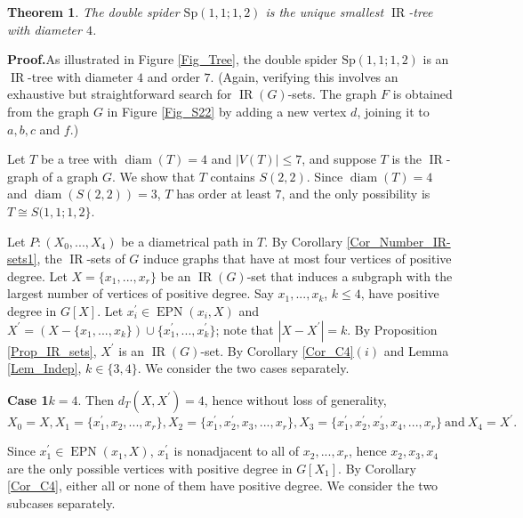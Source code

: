 \documentclass[12pt]{article}%
\newtheorem{theorem}{Theorem}[section]
\begin{document}
\begin{theorem}
\label{Thm_P5}The double spider $\mathrm{Sp}(1,1;1,2)$ is the unique smallest
$\operatorname{IR}$-tree with diameter $4$.
\end{theorem}

\noindent\textbf{Proof.\hspace{0.1in}}As illustrated in Figure \ref{Fig_Tree},
the double spider $\mathrm{Sp}(1,1;1,2)$ is an $\operatorname{IR}$-tree with
diameter $4$ and order $7$. (Again, verifying this involves an exhaustive but
straightforward search for $\operatorname{IR}(G)$-sets. The graph $F$ is
obtained from the graph $G$ in Figure \ref{Fig_S22} by adding a new vertex
$d$, joining it to $a,b,c$ and $f$.)

Let $T$ be a tree with $\operatorname{diam}(T)=4$ and $|V(T)|\leq7$, and
suppose $T$ is the $\operatorname{IR}$-graph of a graph $G$. We show that $T$
contains $S(2,2)$. Since $\operatorname{diam}(T)=4$ and $\operatorname{diam}%
(S(2,2))=3$, $T$ has order at least $7$, and the only possibility is $T\cong
S(1,1;1,2\}$.

Let $P:(X_{0},...,X_{4})$ be a diametrical path in $T$. By Corollary
\ref{Cor_Number_IR-sets1}, the $\operatorname{IR}$-sets of $G$ induce graphs
that have at most four vertices of positive degree. Let $X=\{x_{1}%
,...,x_{r}\}$ be an $\operatorname{IR}(G)$-set that induces a subgraph with
the largest number of vertices of positive degree. Say $x_{1},...,x_{k}$,
$k\leq4$, have positive degree in $G[X]$. Let $x_{i}^{\prime}\in
\operatorname{EPN}(x_{i},X)$ and $X^{\prime}=(X-\{x_{1},...,x_{k}%
\})\cup\{x_{1}^{\prime},...,x_{k}^{\prime}\}$; note that $|X-X^{\prime}|=k$.
By Proposition \ref{Prop_IR_sets}, $X^{\prime}$ is an $\operatorname{IR}%
(G)$-set. By Corollary \ref{Cor_C4}$(i)$ and Lemma \ref{Lem_Indep},
$k\in\{3,4\}$. We consider the two cases separately.

\noindent\textbf{Case 1\hspace{0.1in}}$k=4$. Then $d_{T}(X,X^{\prime})=4$,
hence without loss of generality,
\[
X_{0}=X,X_{1}=\{x_{1}^{\prime},x_{2},...,x_{r}\},X_{2}=\{x_{1}^{\prime}%
,x_{2}^{\prime},x_{3},...,x_{r}\},X_{3}=\{x_{1}^{\prime},x_{2}^{\prime}%
,x_{3}^{\prime},x_{4},...,x_{r}\}\ \text{and}\ X_{4}=X^{\prime}.
\]


Since $x_{1}^{\prime}\in\operatorname{EPN}(x_{1},X)$, $x_{1}^{\prime}$ is
nonadjacent to all of $x_{2},...,x_{r}$, hence $x_{2},x_{3},x_{4}$ are the
only possible vertices with positive degree in $G[X_{1}]$. By Corollary
\ref{Cor_C4}, either all or none of them have positive degree. We consider the
two subcases separately.\medskip
\end{document}

